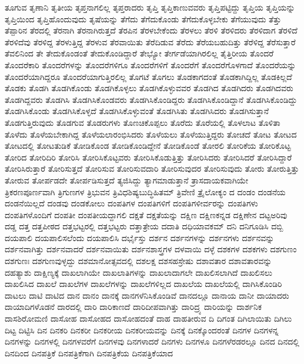 {ತೂಗುವ
ತೃಣಾನಿ
ತೃತೀಯ
ತೃಪ್ತನಾಗಲಿಲ್ಲ
ತೃಪ್ತರಾದರು
ತೃಪ್ತಿ
ತೃಪ್ತಿಕಾಣುವವರು
ತೃಪ್ತಿಪಟ್ಟಿದ್ದು
ತೃಪ್ತಿಯ
ತೃಪ್ತಿಯನ್ನು
ತೃಪ್ತಿಯಿಂದ
ತೃಪ್ತಿಹೊಂದುವುದು
ತೃಷೆಯನ್ನು
ತೆಗೆದು
ತೆಗೆದುಕೊಂಡು
ತೆಗೆದುಕೊಳ್ಳಬೇಕು
ತೆಗೆಯುವುದು
ತೆತ್ತು
ತೆಪ್ಪಾರಿನ
ತೆರದಲ್ಲಿ
ತೆರನಾಗಿ
ತೆರನಾಗಿರುತ್ತದೆ
ತೆರಪಿನ
ತೆರಳಬೇಕೆಂದು
ತೆರಳಲು
ತೆರಳಿ
ತೆರಳಿದರು
ತೆರಳಿದಾಗ
ತೆರಳಿದೆ
ತೆರಳಿದೆವು
ತೆರಳಿದ್ದ
ತೆರಳುತ್ತಿದ್ದ
ತೆರಳುವ
ತೆರವಾಯಿತು
ತೆರೆದಿಡುವ
ತೆರೆದು
ತೆರೆಯಬಹುದಿತ್ತು
ತೆರೆಳಿದ್ದ
ತೆರೆಸುತ್ತಾರೆ
ತೆವಲಿನಿಂದ
ತೇ
ತೇದುಕೊಂಡಂತೆ
ತೇದುಕೊಂಡಿದ್ದಾರೆ
ತೇಭ್ಯೋ
ತೇರ್ಗಡೆಯಾಗಿರಲಿಲ್ಲ
ತೈತ್ತಿರೀಯ
ತೊಂದರೆ
ತೊಂದರೆಕಾರಿ
ತೊಂದರೆಗಳನ್ನು
ತೊಂದರೆಗಳಿಗೂ
ತೊಂದರೆಗಳಿಗೆ
ತೊಂದರೆಗೆ
ತೊಂದರೆಗೊಳಗಾದೆ
ತೊಂದರೆಯನ್ನು
ತೊಂದರೆಯಾಗಿದ್ದರೂ
ತೊಂದರೆಯಾಗುತ್ತಿರಲಿಲ್ಲ
ತೊಗಟೆ
ತೊಗಲು
ತೊಡಕಾಗದಂತೆ
ತೊಡಕಾಗಿದ್ದಿಲ್ಲ
ತೊಡಕಿಲ್ಲದೆ
ತೊಡಕು
ತೊಡಗಿ
ತೊಡಗಿಕೊಂಡು
ತೊಡಗಿಕೊಳ್ಳಲು
ತೊಡಗಿಕೊಳ್ಳುವವರ
ತೊಡಗಿದ
ತೊಡಗಿದರು
ತೊಡಗಿದವರು
ತೊಡಗಿದ್ದವರು
ತೊಡಗಿಸಿ
ತೊಡಗಿಸಿಕೊಂಡವರು
ತೊಡಗಿಸಿಕೊಂಡಿದ್ದರು
ತೊಡಗಿಸಿಕೊಂಡಿದ್ದಾನೆ
ತೊಡಗಿಸಿಕೊಂಡಿದ್ದು
ತೊಡಗಿಸಿಕೊಂಡು
ತೊಡಗಿಸಿಕೊಳ್ಳದೆ
ತೊಡಗಿಸಿಕೊಳ್ಳುವಂತೆ
ತೊಡಗಿಸಿತು
ತೊಡಗಿಸಿದರು
ತೊಡಗಿಸುತ್ತಾನೆ
ತೊಡಗುತ್ತಿರುವುದು
ತೊಡಗುವ
ತೊಡರುಗಳು
ತೊಣಚಿಕೊಪ್ಪಲು
ತೊರೆದು
ತೊರೆಯಲ್ಲಿ
ತೊಳಲಾಟ
ತೊಳಿತಾ
ತೊಳೆದು
ತೊಳೆಯಬೇಕಾಗಿದ್ದ
ತೊಳೆಯಲಾರಂಭಿಸಿದರು
ತೊಳೆಯಲು
ತೊಳೆಯುತ್ತಿದ್ದರು
ತೋಚದೆ
ತೋಟ
ತೋಟದ
ತೋಟದಲ್ಲಿ
ತೋಟತುಡಿಕೆ
ತೋಡಿಕೊಂಡ
ತೋಡಿಕೊಂಡಿದ್ದೇನೆ
ತೋಡಿಕೊಂಡೆ
ತೋರಲಿ
ತೋರಿಕೆಯ
ತೋರಿಕೊಟ್ಟ
ತೋರಿದ
ತೋರಿದಿರಿ
ತೋರಿಸಿ
ತೋರಿಸಿಕೊಟ್ಟವರು
ತೋರಿಸಿಕೊಡುತ್ತಿತ್ತು
ತೋರಿಸಿದರು
ತೋರಿಸಿದರೆ
ತೋರಿಸಿದ್ದಾರೆ
ತೋರಿಸಿರುತ್ತಾರೆ
ತೋರಿಸುತ್ತದೆ
ತೋರಿಸುವ
ತೋರಿಸುವದಾರಿ
ತೋರಿಸುವುದರ
ತೋರಿಸುವುದು
ತೋರು
ತೋರುತ್ತಿತ್ತು
ತೋರುವ
ತೋರ್ಪಡದೇ
ತೋರ್ಪಡಿಸುತ್ತದೆ
ತ್ಯಜಿಸಿದ್ದು
ತ್ಯಾಗಮಾಡುತ್ತಾನೆ
ತ್ರಾಸದಾಯಕವಾಗಿಯೇ
ತ್ರಿಕರಣಪೂರ್ಣವಾಗಿ
ತ್ರಿಗುಣಗಳ
ತ್ರಿಭುವನ
ತ್ರಿವಿಧಶಿಷ್ಯಬುದ್ಧಿಹಿತಮ್
ತ್ರಿವೇಣಿ
ತ್ರೈಲೋಕ್ಯಂ
ದ
ದಂಡಂ
ದಂಡನೆಯ
ದಂಡನೆಯಿಲ್ಲದೆ
ದಂಡವು
ದಂಡಕೋಲು
ದಂಪತಿಗಳ
ದಂಪತಿಗಳಿಗೆ
ದಂಪತಿಗಳೀರ್ವರನ್ನು
ದಂಪತಿಗಳು
ದಂಪತಿಗಳೊಂದಿಗೆ
ದಂಪತೀ
ದಂಪತೀಯದ್ದಾಗಲಿ
ದಕ್ಷತೆ
ದಕ್ಷತೆಯನ್ನು
ದಕ್ಷಿಣ
ದಕ್ಷಿಣಕನ್ನಡ
ದಕ್ಷಿಣೇನ
ದಟ್ಟಅರಿವು
ದಡ್ಡ
ದತ್ತ
ದತ್ತಪೀಠದ
ದತ್ತಭಟ್ಟರಲ್ಲಿ
ದತ್ತಭಟ್ಟರು
ದತ್ತಾತ್ರೇಯ
ದದಾತಿ
ದಧಿಯಾವಕಮ್
ದನಿ
ದನಿಗೂಡಿಸಿ
ದಬ್ಬಿ
ದಯಪಾಲಿ
ದಯಪಾಲಿಸಲೆಂದು
ದಯಪಾಲಿಸಿ
ದರ್ಭೈಸ್ತು
ದರ್ಶನ
ದರ್ಶನಗಳನ್ನು
ದರ್ಶನಗಳು
ದರ್ಶನವನ್ನು
ದರ್ಶನವಾಗಿತ್ತು
ದರ್ಶನವಾದರೆ
ದರ್ಶನವಾಯಿತು
ದರ್ಶನಶಾಸ್ತ್ರಗಳ
ದಳವಾಯಿ
ದಳ್ಳೆ
ದಶಕಗಳ
ದಶಕಗಳು
ದಶಗುಣಂ
ದಶಗುಣಃ
ದಶಗುಣವುಳ್ಳದ್ದು
ದಶಮಾನೋತ್ಸವದಲ್ಲಿ
ದಶಲಕ್ಷ
ದಶಸಹಸ್ರೇಷು
ದಶಾವತಾರ
ದಶಾವತಾರವನ್ನು
ದಹತ್ಯಾಶು
ದಾಕ್ಷಿಣ್ಯಕ್ಕೆ
ದಾಖಲಾಗಿಯೇ
ದಾಖಲಾತಿಗಳನ್ನು
ದಾಖಲಾದಾಗಲೇ
ದಾಖಲಿಸಲಾಗಿದೆ
ದಾಖಲಿಸಲು
ದಾಖಲಿಸಿದ
ದಾಖಲೆ
ದಾಖಲೆಗಳ
ದಾಖಲೆಗಳನ್ನು
ದಾಖಲೆಗಳಿಲ್ಲದ
ದಾಖಲೆಯ
ದಾಖಲೆಯಲ್ಲಿ
ದಾಗಿಸಿಕೊಂಡಿರಿ
ದಾಟಲು
ದಾಟಿ
ದಾಟಿದ
ದಾನ
ದಾನಂ
ದಾನಕ್ಕೆ
ದಾನಗಳೆನಿಸಿಕೊಂಡಿವೆ
ದಾನದಲ್ಲೂ
ದಾನಾಯ
ದಾನೀ
ದಾಯಾದರು
ದಾಯಾದಿಗಳೊಡನೆ
ದಾರದಲ್ಲಿ
ದಾರಿ
ದಾರಿಕಾಣದೆ
ದಾರಿದೀಪವಾಗಿತ್ತು
ದಾರಿದ್ರ್ಯ
ದಾರಿಯನ್ನು
ದಾರ್ಶನಿಕ
ದಾಸಶಿರೋಮಣಿ
ದಾಸೋಹ
ದಾಸೋಹದ
ದಾಸೋಹದಂತೆ
ದಾಹ
ದಾಹತೀರುವ
ದಿ
ದಿಗಂತ
ದಿಗಿಲಾಯಿತು
ದಿಗಿಲು
ದಿಟ್ಟ
ದಿಟ್ಟಿಸಿ
ದಿನ
ದಿನಕರಿ
ದಿನಕರೀ
ದಿನಕರೀಯ
ದಿನಕರೀಯವನ್ನು
ದಿನಕ್ಕೆ
ದಿನಕ್ಕೊಂದರಂತೆ
ದಿನಗಳ
ದಿನಗಳನ್ನ
ದಿನಗಳನ್ನು
ದಿನಗಳಲ್ಲಿ
ದಿನಗಳವರೆಗೆ
ದಿನಗಳವು
ದಿನಗಳಾದರೆ
ದಿನಗಳು
ದಿನಗಳೂ
ದಿನಗಳೆರಡರಲ್ಲೂ
ದಿನದ
ದಿನದಲ್ಲಿ
ದಿನದಿಂದ
ದಿನಪತ್ರಿಕೆ
ದಿನಪತ್ರಿಕೆಗಾಗಿ
ದಿನಪತ್ರಿಕೆಯ
ದಿನಪತ್ರಿಕೆಯಾದ
}

